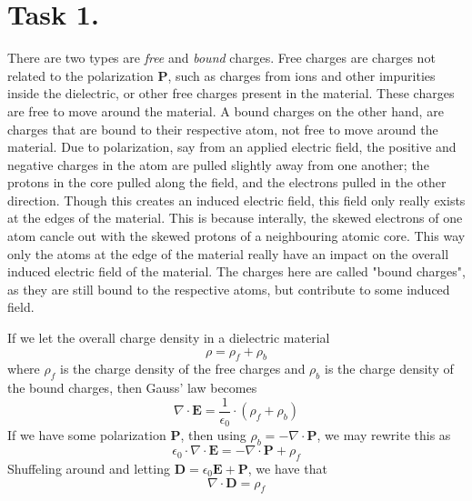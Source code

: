 \documentclass[a4paper,11pt]{article}
\begin{document}


\section*{Task 1.}
\begin{alphalist}
    \item There are two types are \textit{free} and \textit{bound} charges. Free charges are charges not related to the polarization $\mathbf{P}$, such 
        as charges from ions and other impurities inside the dielectric, or other free charges present in the material. These charges are free to move around the 
        material. A bound charges on the other hand, are charges that are bound to their respective atom, not free to move around the material. Due to polarization, say from an
        applied electric field, the positive and negative charges in the atom are pulled slightly away from one another; the protons in the core pulled along the field, and the 
        electrons pulled in the other direction. Though this creates an induced electric field, this field only really exists at the edges of the material. This is because interally,
        the skewed electrons of one atom cancle out with the skewed protons of a neighbouring atomic core. This way only the atoms at the edge of the material really have an impact on the overall
        induced electric field of the material. The charges here are called "bound charges", as they are still bound to the respective atoms, but contribute to some induced field.
    \item If we let the overall charge density in a dielectric material 
        \[
            \rho = \rho_f + \rho_b
        \]
        where $\rho_f$ is the charge density of the free charges and $\rho_b$ is the charge density of the bound charges, then Gauss' law becomes
        \[
            \nabla \cdot \mathbf{E} = \frac{1}{\epsilon_0} \cdot (\rho_f + \rho_b)
        \]
        If we have some polarization $\mathbf{P}$, then using $\rho_b = -\nabla \cdot \mathbf{P}$, we may rewrite this as
        \[
            \epsilon_0 \cdot \nabla \cdot \mathbf{E} = -\nabla \cdot \mathbf{P} + \rho_f
        \]
        Shuffeling around and letting $\mathbf{D} = \epsilon_0 \mathbf{E} + \mathbf{P}$, we have that
        \[
            \nabla \cdot \mathbf{D} = \rho_f
        \]
\end{alphalist}
\end{document}
